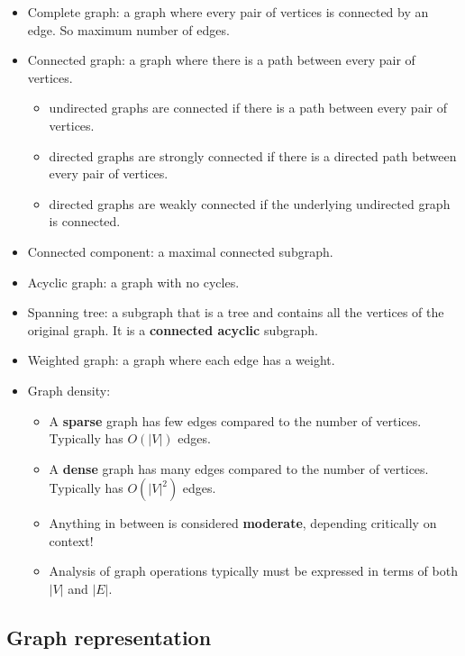 \documentclass[letterpaper,12pt]{article}
\begin{document}
\begin{itemize}
\begin{itemize}
    \end{itemize}
    \item Complete graph: a graph where every pair of vertices is connected by an edge. So maximum number of edges.
    \item Connected graph: a graph where there is a path between every pair of vertices.
    \begin{itemize}
        \item undirected graphs are connected if there is a path between every pair of vertices.
        \item directed graphs are strongly connected if there is a directed path between every pair of vertices.
        \item directed graphs are weakly connected if the underlying undirected graph is connected.
    \end{itemize}
    \item Connected component: a maximal connected subgraph. 
    \item Acyclic graph: a graph with no cycles.
    \item Spanning tree: a subgraph that is a tree and contains all the vertices of the original graph. It is a \textbf{connected acyclic} subgraph.
    \item Weighted graph: a graph where each edge has a weight.
    \item Graph density: \begin{itemize}
        \item A \textbf{sparse} graph has few edges compared to the number of vertices. Typically has $O(|V|)$ edges.
        \item A \textbf{dense} graph has many edges compared to the number of vertices. Typically has $O(|V|^2)$ edges.
        \item Anything in between is considered \textbf{moderate}, depending critically on context! 
        \item Analysis of graph operations typically must be expressed in terms of both $|V|$ and $|E|$.
    \end{itemize}
\end{itemize}
\subsection{Graph representation}
\end{document}
